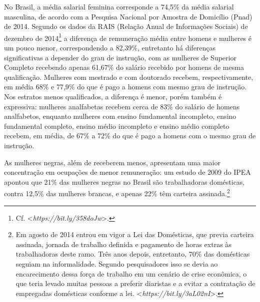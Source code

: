 No Brasil, a média salarial feminina corresponde a 74,5\% da média
salarial masculina, de acordo com a Pesquisa Nacional por Amostra de
Domicílio (Pnad) de 2014. Segundo os dados da RAIS (Relação Anual de
Informações Sociais) de dezembro de 2014\footnote{Cf.
  \textless{}\emph{https://bit.ly/358doJw}\textgreater{}.}
a diferença de remuneração média entre homens e mulheres é um pouco
menor, correspondendo a 82,39\%, entretanto há diferenças significativas
a depender do grau de instrução, com as mulheres de Superior Completo
recebendo apenas 61,67\% do salário recebido por homens de mesma
qualificação. Mulheres com mestrado e com doutorado recebem,
respectivamente, em média 68\% e 77,9\% do que é pago a homens com mesmo
grau de instrução. Nos estratos menos qualificados, a diferença é menor,
porém também é expressiva: mulheres analfabetas recebem cerca de 83\% do
salário de homens analfabetos, enquanto mulheres com ensino fundamental
incompleto, ensino fundamental completo, ensino médio incompleto e
ensino médio completo recebem, em média, de 67\% a 72\% do que é pago a
homens com o mesmo grau de instrução.

As mulheres negras, além de receberem menos, apresentam uma maior
concentração em ocupações de menor remuneração: um estudo de 2009 do
IPEA apontou que 21\% das mulheres negras no Brasil são trabalhadoras
domésticas, contra 12,5\% das mulheres brancas, e apenas 22\% têm
carteira assinada.\footnote{Em agosto de 2014 entrou em vigor a Lei das
  Domésticas, que previa carteira assinada, jornada de trabalho definida
  e pagamento de horas extras às trabalhadoras deste ramo. Três anos
  depois, entretanto, 70\% das domésticas seguiam na informalidade.
  Segundo pesquisadores isso se devia ao encarecimento dessa força de
  trabalho em um cenário de crise econômica, o que teria levado muitas
  pessoas a preferir diaristas e a evitar a contratação de empregadas
  domésticas conforme a lei.
  \textless{}\emph{https://bit.ly/3aL02nI}\textgreater{}.}

